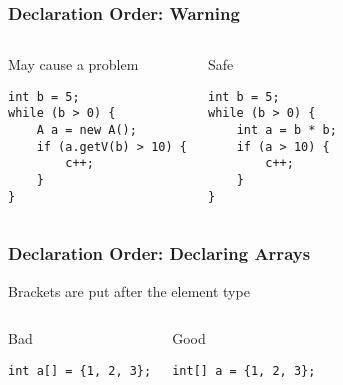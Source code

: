 \documentclass[screen]{beamer}
\newcommand{\badgood}[2]{%
	\begin{columns}%
		\column{.5\textwidth}%
		\begin{alertblock}{Bad}%
			#1%
		\end{alertblock}%
		\column{.5\textwidth}%
		\begin{exampleblock}{Good}%
			#2%
		\end{exampleblock}%
	\end{columns}%
}%
\begin{document}
\begin{frame}[fragile]
\frametitle{Declaration Order: Warning}%
\begin{columns}
\begin{alertblock}{May cause a problem}
\begin{lstlisting}
int b = 5;
while (b > 0) {
    A a = new A();
    if (a.getV(b) > 10) {
        c++;
    }
}
\end{lstlisting}
\end{alertblock}
\begin{exampleblock}{Safe}
\begin{lstlisting}
int b = 5;
while (b > 0) {
    int a = b * b;
    if (a > 10) {
        c++;
    }
}
\end{lstlisting}
\end{exampleblock}
\end{columns}
\end{frame}

\begin{frame}[fragile]
\frametitle{Declaration Order: Declaring Arrays}%
%
\begin{block}{Brackets are put after the \alert{element type}}
	\badgood{
		\lstinline!int a[] = {1, 2, 3};!\\
	}{
		\lstinline!int[] a = {1, 2, 3};!\\
	}
\end{block}
\end{frame}

\end{document}
